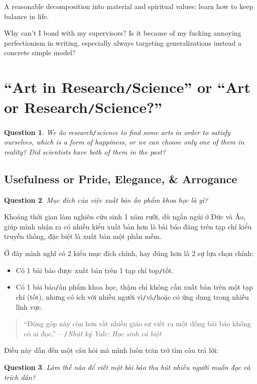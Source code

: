 \documentclass{article}
\numberwithin{equation}{section}
\newtheorem{ques}{Question}[section]
\begin{document}
A reasonable decomposition into material and spiritual values: learn how to keep balance in life.

Why can't I bond with my supervisors? Is it because of my fucking annoying perfectionism in writing, especially always targeting generalizations instead a concrete simple model?

\section{``Art in Research\texttt{/}Science'' or ``Art or Research\texttt{/}Science?''}
\begin{ques}
	We do research\texttt{/}science to find some arts in order to satisfy ourselves, which is a form of happiness, or we can choose only one of them in reality? Did scientists have both of them in the past?
\end{ques}

\subsection{Usefulness or Pride, Elegance, \& Arrogance}
\begin{ques}
	Mục đích của việc xuất bản ấn phẩm khoa học là gì?
\end{ques}
Khoảng thời gian làm nghiên cứu sinh 1 năm rưỡi, dù ngắn ngủi ở Đức và Áo, giúp mình nhận ra có nhiều kiểu xuất bản hơn là bài báo đăng trên tạp chí kiểu truyền thống, đặc biệt là xuất bản một phần mềm.

Ở đây mình nghĩ có 2 kiểu mục đích chính, hay đúng hơn là 2 sự lựa chọn chính:
\begin{itemize}
	\item Có 1 bài báo được xuất bản trên 1 tạp chí top\texttt{/}tốt.
	\item Có 1 bài báo\texttt{/}ấn phẩm khoa học, thậm chí không cần xuất bản trên một tạp chí (tốt), nhưng có ích với nhiều người vì\texttt{/}và\texttt{/}hoặc có ứng dụng trong nhiều lĩnh vực.
\end{itemize}

\begin{quotation}
	``Đóng góp này còn hơn rất nhiều giáo sư viết ra một đống bài báo không có ai đọc.'' -- \cite{VHV's blog}\texttt{/}\textit{Nhật ký Yale: Học sinh cá biệt}
\end{quotation}
Điều này dẫn đến một câu hỏi mà mình luôn trăn trở tìm câu trả lời:
\begin{ques}
	Làm thế nào để viết một bài báo thu hút nhiều người muốn đọc và trích dẫn?
\end{ques}
\end{document}
